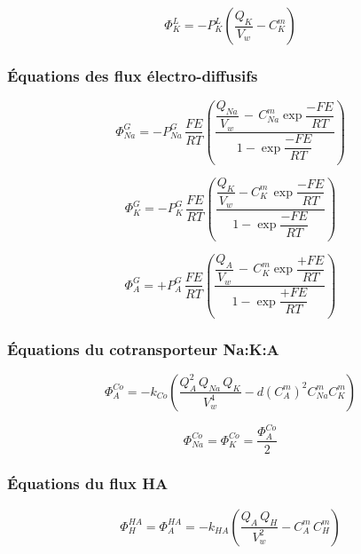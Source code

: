 \documentclass[a4paper,fleqn]{article}
\begin{document}
\begin{equation}
\Phi_{K}^{L}=-P_{K}^{L}\left(\frac{Q_{K}}{V_w}-C_{K}^{m}\right)
\end{equation}

\subsubsection*{Équations des flux électro-diffusifs}

\begin{equation}
\Phi_{Na}^{G}=-P_{Na}^{G}\,\frac{FE}{RT}\left(\frac{\dfrac{Q_{Na}}{V_w}\,-\,{C_{Na}^{m}\exp{\dfrac{-FE}{RT}}}}{1 - \exp{\dfrac{-FE}{RT}}}\right)
\end{equation}

\begin{equation}
\Phi_{K}^{G}=-P_{K}^{G}\,\frac{FE}{RT}\left(\dfrac{\dfrac{Q_{K}}{V_w}-{C_{K}^{m}\,\exp{\dfrac{-FE}{RT}}}}{1 - \exp{\dfrac{-FE}{RT}}}\right)
\end{equation}

\begin{equation}
\Phi_{A}^{G}=+P_{A}^{G}\,\frac{FE}{RT}\left(\dfrac{\dfrac{Q_{A}}{V_w}\,-\,{C_{K}^{m}\exp{\dfrac{+FE}{RT}}}}{1 - \exp{\dfrac{+FE}{RT}}}\right)
\end{equation}

\subsubsection*{Équations du cotransporteur Na:K:A}

\begin{equation}
\Phi_{A}^{Co}=-k_{Co}\left(\frac{Q_{A}^2\,Q_{Na}\,Q_{K}}{V_w^4}-d\left(C_{A}^{m}\right)^2C_{Na}^{m}C_{K}^{m}\right)
\end{equation}

\begin{equation}
\Phi_{Na}^{Co}=\Phi_{K}^{Co}=\frac{\Phi_{A}^{Co}}{2}
\end{equation}

\subsubsection*{Équations du flux HA}

\begin{equation}
\Phi_{H}^{HA}=\Phi_{A}^{HA}=-k_{HA}( \frac{Q_A\,Q_H}{V_w^2} - C_{A}^{m}\,C_{H}^{m})
\end{equation}\\
\end{document}
